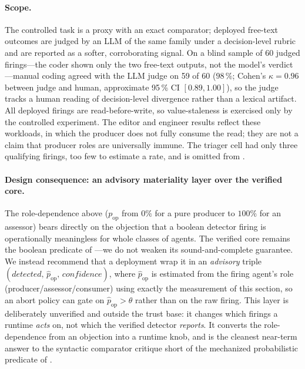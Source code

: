 \documentclass[journal,compsoc,10pt]{IEEEtran}
\theoremstyle{definition}
\theoremstyle{remark}
\begin{document}
\paragraph{Scope.} The controlled task is a proxy with an exact
comparator; deployed free-text outcomes are judged by an LLM of the same
family under a decision-level rubric and are reported as a softer,
corroborating signal. On a blind sample of 60 judged firings---the
coder shown only the two free-text outputs, not the model's
verdict---manual coding agreed with the LLM judge on 59 of 60
($98\,\%$; Cohen's $\kappa=0.96$ between judge and human, approximate
95\,\% CI $[0.89, 1.00]$), so the judge tracks a human reading of
decision-level divergence rather than a lexical artifact. All deployed firings are read-before-write,
so value-staleness is exercised only by the controlled experiment. The
editor and engineer results reflect these workloads, in which the
producer does not fully consume the read; they are not a claim that
producer roles are universally immune. The triager cell had only three
qualifying firings, too few to estimate a rate, and is omitted from
.

\paragraph{Design consequence: an advisory materiality layer over the
verified core.} The role-dependence above ($p_{\text{op}}$ from $0\%$ for
a pure producer to $100\%$ for an assessor) bears directly on the
objection that a boolean detector firing is operationally meaningless for
whole classes of agents. The verified core remains the boolean predicate
of ---we do not weaken its sound-and-complete
guarantee. We instead recommend that a deployment wrap it in an
\emph{advisory} triple $(\textit{detected},\,\hat{p}_{\text{op}},\,
\textit{confidence})$, where $\hat{p}_{\text{op}}$ is estimated from the
firing agent's role (producer/assessor/consumer) using exactly the
measurement of this section, so an abort policy can gate on
$\hat{p}_{\text{op}}>\theta$ rather than on the raw firing. This layer is
deliberately unverified and outside the trust base: it changes which
firings a runtime \emph{acts} on, not which the verified detector
\emph{reports}. It converts the role-dependence from an objection into a
runtime knob, and is the cleanest near-term answer to the syntactic
comparator critique short of the mechanized probabilistic predicate of
.
\end{document}
